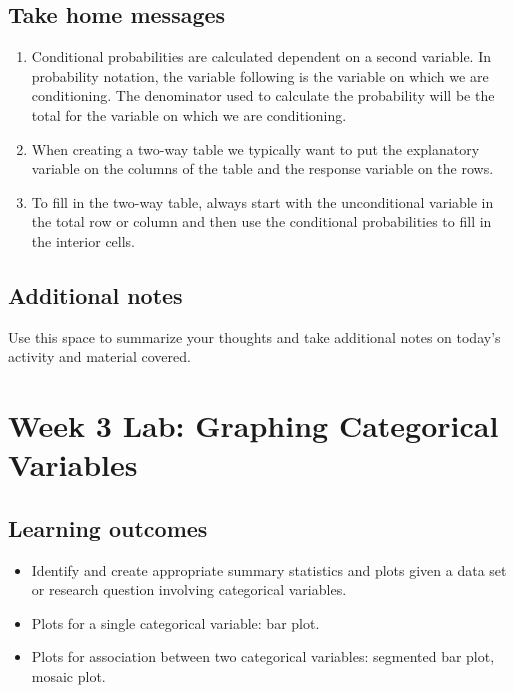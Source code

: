 \documentclass[
]{report}
\begin{document}
\newpage

\hypertarget{take-home-messages-4}{%
\subsection{Take home messages}\label{take-home-messages-4}}

\begin{enumerate}
\def\labelenumi{\arabic{enumi}.}
\item
  Conditional probabilities are calculated dependent on a second variable. In probability notation, the variable following \texttt{\textbar{}} is the variable on which we are conditioning. The denominator used to calculate the probability will be the total for the variable on which we are conditioning.
\item
  When creating a two-way table we typically want to put the explanatory variable on the columns of the table and the response variable on the rows.
\item
  To fill in the two-way table, always start with the unconditional variable in the total row or column and then use the conditional probabilities to fill in the interior cells.
\end{enumerate}

\hypertarget{additional-notes-4}{%
\subsection{Additional notes}\label{additional-notes-4}}

Use this space to summarize your thoughts and take additional notes on today's activity and material covered.

\newpage

\hypertarget{week-3-lab-graphing-categorical-variables}{%
\section{Week 3 Lab: Graphing Categorical Variables}\label{week-3-lab-graphing-categorical-variables}}


\hypertarget{learning-outcomes-5}{%
\subsection{Learning outcomes}\label{learning-outcomes-5}}

\begin{itemize}
\item
  Identify and create appropriate summary statistics and plots given a data set or research question involving categorical variables.
\item
  Plots for a single categorical variable: bar plot.
\item
  Plots for association between two categorical variables:
  segmented bar plot, mosaic plot.
\end{itemize}
\end{document}
